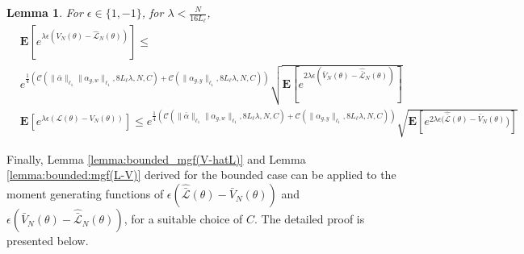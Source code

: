 \documentclass{article}
\newtheorem{lemma}[theorem]{Lemma}
\newcommand{\e}{\mathbf{e}}
\newcommand{\bE}{\mathbf{E}}
\begin{document}
\begin{lemma}
\label{basic_lemma:lipschitz3}
For $\epsilon \in \{1,-1\}$, for $\lambda< \frac{N}{16L_{\ell}}$,
\begin{align*}
 & \bE[e^{\lambda \epsilon (V_N(\theta)-\hat{\mathcal{L}}_N(\theta))}]   
 \le \\
 &e^{\frac{1}{4}(\mathcal{C}(\|\bar{\alpha}\|_{\ell_1}\|\alpha_{g,w}\|_{\ell_1}, 8L_{\ell}\lambda,N,C)+\mathcal{C}(\|\alpha_{g,y}\|_{\ell_1}, 8L_{\ell}\lambda,N,C))}
 \sqrt{\bE[e^{2\lambda \epsilon (\bar{V}_N(\theta)-\hat{\bar{\mathcal{L}}}_N(\theta))}]} 
 \\
 & \bE[e^{\lambda \epsilon (\mathcal{L}(\theta)-V_N(\theta))}]   
 \le e^{\frac{1}{4}(\mathcal{C}(\|\bar{\alpha}\|_{\ell_1}\|\alpha_{g,w}\|_{\ell_1}, 8L_{\ell}\lambda,N,C)+\mathcal{C}(\|\alpha_{g,y}\|_{\ell_1}, 8L_{\ell}\lambda,N,C))}
 \sqrt{\bE[e^{2\lambda \epsilon (\hat{\bar{\mathcal{L}}}(\theta)-\bar{V}_N(\theta)})]}
\end{align*}
\end{lemma}
Finally, Lemma \ref{lemma:bounded_mgf(V-hatL)} and Lemma \ref{lemma:bounded:mgf(L-V)} 
derived for the bounded case can be applied to the moment generating functions of
$\epsilon (\hat{\bar{\mathcal{L}}}(\theta)-\bar{V}_N(\theta))$ and $\epsilon (\bar{V}_N(\theta)-\hat{\bar{\mathcal{L}}}_N(\theta))$, for a suitable choice of $C$. %
The detailed proof is presented below. 
\end{document}
